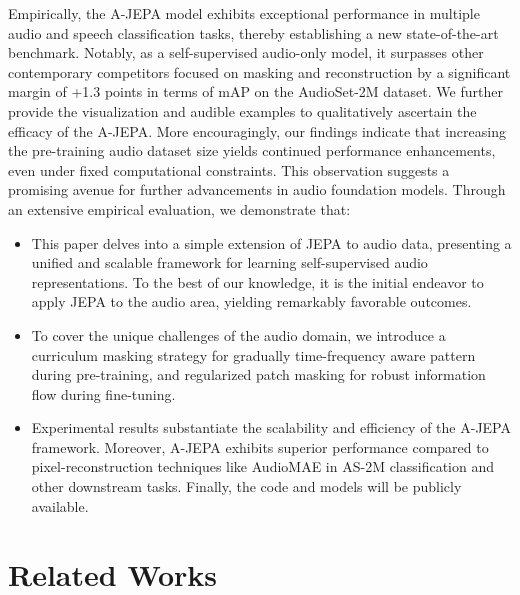 \documentclass{article}
\begin{document}
Empirically, the A-JEPA model exhibits exceptional performance in multiple audio and speech classification tasks, thereby establishing a new state-of-the-art benchmark. 
Notably, as a self-supervised audio-only model, it surpasses other contemporary competitors focused on masking and reconstruction by a significant margin of +1.3 points in terms of mAP on the AudioSet-2M dataset. We further provide the visualization and audible examples to qualitatively ascertain the efficacy of the A-JEPA. 
More encouragingly, our findings indicate that increasing the pre-training audio dataset size yields continued performance enhancements, even under fixed computational constraints. This observation suggests a promising avenue for further advancements in audio foundation models. 
Through an extensive empirical evaluation, we demonstrate that:
\begin{itemize}
    \item This paper delves into a simple extension of JEPA to audio data, presenting a unified and scalable framework for learning self-supervised audio representations. 
    To the best of our knowledge, it is the initial endeavor to apply JEPA to the audio area, yielding remarkably favorable outcomes. 
    \item To cover the unique challenges of the audio domain, we introduce a curriculum masking strategy for gradually time-frequency aware pattern during pre-training, and regularized patch masking for robust information flow during fine-tuning. 
    \item  Experimental results substantiate the scalability and efficiency of the A-JEPA framework. Moreover, A-JEPA exhibits superior performance compared to pixel-reconstruction techniques like AudioMAE in AS-2M classification and other downstream tasks. Finally, the code and models will be publicly available. 
\end{itemize}


\section{Related Works}
\end{document}
